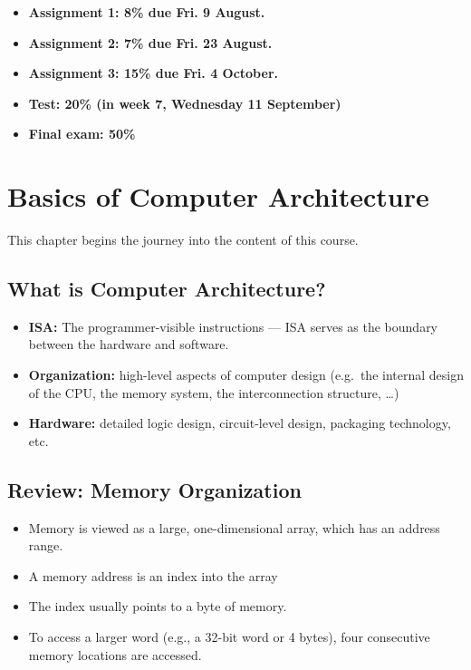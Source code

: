 \documentclass[
  12pt,
  a4paper,
]{report}
\begin{document}
\begin{itemize}
\item
  \textbf{Assignment 1: 8\% due Fri. 9 August.}
\item
  \textbf{Assignment 2: 7\% due Fri. 23 August.}
\item
  \textbf{Assignment 3: 15\% due Fri. 4 October.}
\item
  \textbf{Test: 20\% (in week 7, Wednesday 11 September)}
\item
  \textbf{Final exam: 50\%}
\end{itemize}

\chapter{Basics of Computer
Architecture}\label{basics-of-computer-architecture}

This chapter begins the journey into the content of this course.

\section{What is Computer
Architecture?}\label{what-is-computer-architecture}

\begin{itemize}
\item
  \textbf{ISA:} The programmer-visible instructions --- ISA serves as
  the boundary between the hardware and software.
\item
  \textbf{Organization:} high-level aspects of computer design (e.g.~the
  internal design of the CPU, the memory system, the interconnection
  structure, \ldots)
\item
  \textbf{Hardware:} detailed logic design, circuit-level design,
  packaging technology, etc.
\end{itemize}

\section{Review: Memory Organization}\label{review-memory-organization}

\begin{itemize}
\item
  Memory is viewed as a large, one-dimensional array, which has an
  address range.
\item
  A memory address is an index into the array
\item
  The index usually points to a byte of memory.
\item
  To access a larger word (e.g., a 32-bit word or 4 bytes), four
  consecutive memory locations are accessed.
\end{itemize}
\end{document}
